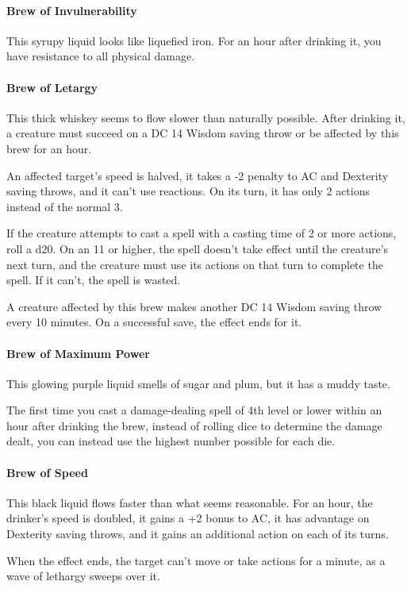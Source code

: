     \paragraph{Brew of Invulnerability}
        This syrupy liquid looks like liquefied iron.
        For an hour after drinking it, you have resistance to all physical damage.
    \paragraph{Brew of Letargy} %
        This thick whiskey seems to flow slower than naturally possible.
        After drinking it, a creature must succeed on a DC 14 Wisdom saving throw or be affected by this brew for an hour.

        An affected target's speed is halved, it takes a -2 penalty to AC and Dexterity saving throws, and it can't use reactions.
        On its turn, it has only 2 actions instead of the normal 3.

        If the creature attempts to cast a spell with a casting time of 2 or more actions, roll a d20.
        On an 11 or higher, the spell doesn't take effect until the creature's next turn, and the creature must use its actions on that turn to complete the spell.
        If it can't, the spell is wasted.

        A creature affected by this brew makes another DC 14 Wisdom saving throw every 10 minutes.
        On a successful save, the effect ends for it.
    \paragraph{Brew of Maximum Power}
        This glowing purple liquid smells of sugar and plum, but it has a muddy taste.

        The first time you cast a damage-dealing spell of 4th level or lower within an hour after drinking the brew, instead of rolling dice to determine the damage dealt, you can instead use the highest number possible for each die.
    \paragraph{Brew of Speed} %
        This black liquid flows faster than what seems reasonable.
        For an hour, the drinker's speed is doubled, it gains a +2 bonus to AC, it has advantage on Dexterity saving throws, and it gains an additional action on each of its turns.

        When the effect ends, the target can't move or take actions for a minute, as a wave of lethargy sweeps over it.
